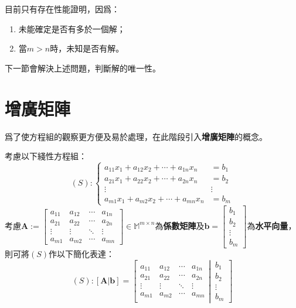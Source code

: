 \documentclass[12pt]{article}
\begin{document}
    目前只有存在性能證明，因爲：\begin{enumerate}
        \item 未能確定是否有多於一個解；
        \item 當$m>n$時，未知是否有解。
    \end{enumerate}

    下一節會解決上述問題，判斷解的唯一性。

    \newpage

    \section*{增廣矩陣}

    爲了使方程組的觀察更方便及易於處理，在此階段引入\textbf{增廣矩陣}的概念。

    考慮以下綫性方程組：$$(S):\begin{cases}
        a_{11}x_1+a_{12}x_2+\cdots+a_{1n}x_{n}&=b_1\\
        a_{21}x_1+a_{22}x_2+\cdots+a_{2n}x_{n}&=b_2\\
        \vdots&\vdots\\
        a_{m1}x_1+a_{m2}x_2+\cdots+a_{mn}x_{n}&=b_m
    \end{cases}$$
    考慮$\mathbf{A}:=\begin{bmatrix}
        a_{11}&a_{12}&\cdots&a_{1n}\\
        a_{21}&a_{22}&\cdots&a_{2n}\\
        \vdots&\vdots&\ddots&\vdots\\
        a_{m1}&a_{m2}&\cdots&a_{mn}
    \end{bmatrix}\in\mathbb{M}^{m\times n}$為\textbf{係數矩陣}及$\mathbf{b}=\begin{bmatrix}
        b_1\\b_2\\\vdots\\b_m
    \end{bmatrix}$為\textbf{水平向量}，則可將$(S)$作以下簡化表達：$$(S):[\mathbf{A}\vert \mathbf{b}]=\left[
        \begin{matrix}
            a_{11}&a_{12}&\cdots&a_{1n}\\
            a_{21}&a_{22}&\cdots&a_{2n}\\
            \vdots&\vdots&\ddots&\vdots\\
            a_{m1}&a_{m2}&\cdots&a_{mn}
        \end{matrix}
        \left|
          \,
          \begin{matrix}
            b_1\\b_2\\\vdots\\b_m
          \end{matrix}
        \right.
      \right]$$
\end{document}
